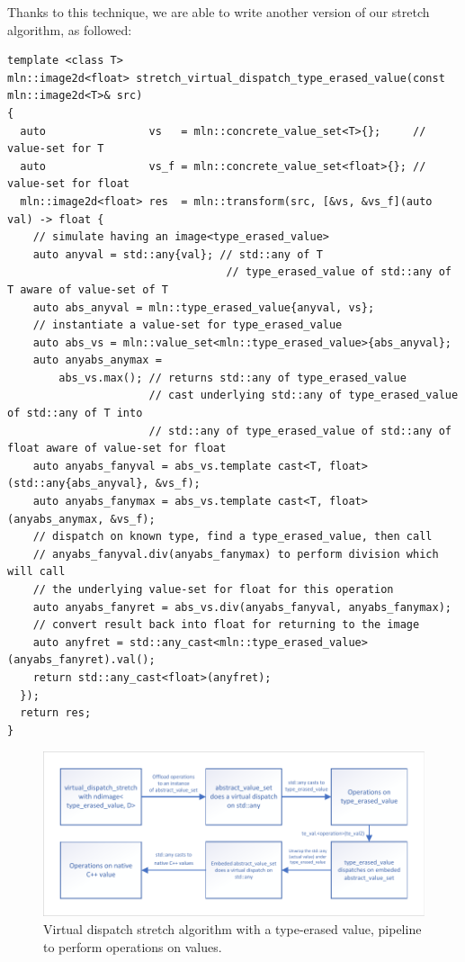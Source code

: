 Thanks to this technique, we are able to write another version of our stretch algorithm, as followed:
\begin{verbatim}
template <class T>
mln::image2d<float> stretch_virtual_dispatch_type_erased_value(const mln::image2d<T>& src)
{
  auto                vs   = mln::concrete_value_set<T>{};     // value-set for T
  auto                vs_f = mln::concrete_value_set<float>{}; // value-set for float
  mln::image2d<float> res  = mln::transform(src, [&vs, &vs_f](auto val) -> float {
    // simulate having an image<type_erased_value>
    auto anyval = std::any{val}; // std::any of T
                                  // type_erased_value of std::any of T aware of value-set of T
    auto abs_anyval = mln::type_erased_value{anyval, vs};
    // instantiate a value-set for type_erased_value
    auto abs_vs = mln::value_set<mln::type_erased_value>{abs_anyval};
    auto anyabs_anymax =
        abs_vs.max(); // returns std::any of type_erased_value
                      // cast underlying std::any of type_erased_value of std::any of T into
                      // std::any of type_erased_value of std::any of float aware of value-set for float
    auto anyabs_fanyval = abs_vs.template cast<T, float>(std::any{abs_anyval}, &vs_f);
    auto anyabs_fanymax = abs_vs.template cast<T, float>(anyabs_anymax, &vs_f);
    // dispatch on known type, find a type_erased_value, then call
    // anyabs_fanyval.div(anyabs_fanymax) to perform division which will call
    // the underlying value-set for float for this operation
    auto anyabs_fanyret = abs_vs.div(anyabs_fanyval, anyabs_fanymax);
    // convert result back into float for returning to the image
    auto anyfret = std::any_cast<mln::type_erased_value>(anyabs_fanyret).val();
    return std::any_cast<float>(anyfret);
  });
  return res;
}
\end{verbatim}

\begin{figure}[htbp]
  \centering
  \includegraphics[width=.8\linewidth]{figs/static_dynamic_bridge/virtual_dispatch_type_erased_value_stretch}
  \caption{Virtual dispatch stretch algorithm with a type-erased value, pipeline to perform operations on values.}
  \label{fig:static_dyn.virtual_dispatch_type_erased_value_stretch}
\end{figure}

